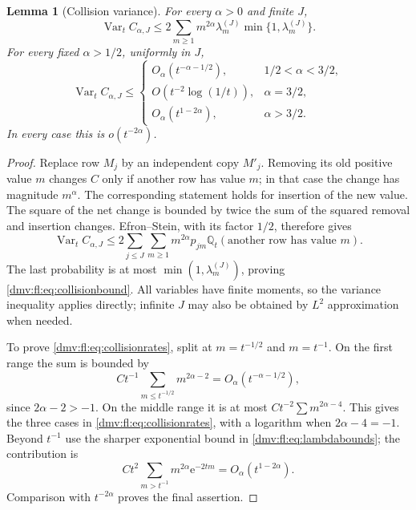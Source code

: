 \documentclass[11pt,letterpaper]{article}
\numberwithin{equation}{section}
\newtheorem{lemma}[theorem]{Lemma}
\theoremstyle{definition}\newtheorem{definition}[theorem]{Definition}
\theoremstyle{remark}\newtheorem{remark}[theorem]{Remark}
\newcommand{\ee}{\mathrm e}
\newcommand{\Q}{\mathbb Q}
\DeclareMathOperator{\Var}{Var}
\begin{document}
\begin{lemma}[Collision variance]\label{dmv:fl:lem:collisions}
For every $\alpha>0$ and finite $J$,
\begin{equation}\label{dmv:fl:eq:collisionbound}
 \Var_t C_{\alpha,J}
 \le 2\sum_{m\ge1}m^{2\alpha}\lambda_m^{(J)}
                                  \min\{1,\lambda_m^{(J)}\}.
\end{equation}
For every fixed $\alpha>1/2$, uniformly in $J$,
\begin{equation}\label{dmv:fl:eq:collisionrates}
 \Var_t C_{\alpha,J}\le
 \begin{cases}
 O_\alpha(t^{-\alpha-1/2}),&1/2<\alpha<3/2,\\
 O(t^{-2}\log(1/t)),&\alpha=3/2,\\
 O_\alpha(t^{1-2\alpha}),&\alpha>3/2.
 \end{cases}
\end{equation}
In every case this is $o(t^{-2\alpha})$.
\end{lemma}
\begin{proof}
Replace row $M_j$ by an independent copy $M'_j$. Removing its old
positive value $m$ changes $C$ only if another row has value $m$;
in that case the change has magnitude $m^\alpha$. The corresponding
statement holds for insertion of the new value. The square of the
net change is bounded by twice the sum of the squared removal and
insertion changes. Efron--Stein, with its factor $1/2$, therefore gives
\[
 \Var_tC_{\alpha,J}
 \le2\sum_{j\le J}\sum_{m\ge1}m^{2\alpha}p_{jm}
       \Q_t(\text{another row has value }m).
\]
The last probability is at most $\min(1,\lambda_m^{(J)})$, proving
\eqref{dmv:fl:eq:collisionbound}. All variables have finite moments, so the
variance inequality applies directly; infinite $J$ may also be
obtained by $L^2$ approximation when needed.

To prove \eqref{dmv:fl:eq:collisionrates}, split at
$m=t^{-1/2}$ and $m=t^{-1}$. On the first range the sum is bounded by
\[
 Ct^{-1}\sum_{m\le t^{-1/2}}m^{2\alpha-2}
 =O_\alpha(t^{-\alpha-1/2}),
\]
since $2\alpha-2>-1$. On the middle range it is at most
$Ct^{-2}\sum m^{2\alpha-4}$. This gives the three cases in
\eqref{dmv:fl:eq:collisionrates}, with a logarithm when $2\alpha-4=-1$.
Beyond $t^{-1}$ use the sharper exponential bound in
\eqref{dmv:fl:eq:lambdabounds}; the contribution is
\[
 Ct^2\sum_{m>t^{-1}}m^{2\alpha}\ee^{-2tm}
 =O_\alpha(t^{1-2\alpha}).
\]
Comparison with $t^{-2\alpha}$ proves the final assertion.
\end{proof}
\end{document}
